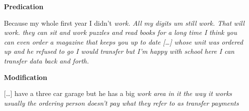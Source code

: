\begin{exe}
  \vspace{1.5em}
  \textbf{Predication}
  \begin{xlist}
    \ex\label{ex:4.4i} Because my whole first year I didn't \em{work}. \vspace{-1.25em} %
    \ex\label{ex:4.4j} All my digits um still \em{work}. \vspace{-1.25em} %
    \ex\label{ex:4.4k} That will \em{work}. \vspace{-1.25em} %
    \ex\label{ex:4.4l} they can sit and \em{work} puzzles and read books for a long time \vspace{-1.25em} %
    \vspace{1.5em}
    \ex\label{ex:4.4m} I think you can even \em{order} a magazine that keeps you up to date \vspace{-1.25em} %
    \ex\label{ex:4.4n} […] whose unit was \em{ordered} up and he refused to go \vspace{-1.25em} %
    \vspace{1.5em}
    \ex\label{ex:4.4o} I would \em{transfer} but I'm happy with school here \vspace{-1.25em} %
    \ex\label{ex:4.4p} I can \em{transfer} data back and forth.  %
  \end{xlist}

  \vspace{1.5em}
  \textbf{Modification}
  \begin{xlist}
    \ex\label{ex:4.4q} […] have a three car garage but he has a big \em{work} area in it \vspace{-1.25em} %
    \vspace{1.5em}
    \ex\label{ex:4.4r} the way it works usually the \em{ordering} person doesn't pay \vspace{-1.25em} %
    \vspace{1.5em}
    \ex\label{ex:4.4s} what they refer to as \em{transfer} payments  %
  \end{xlist}

\end{exe}

